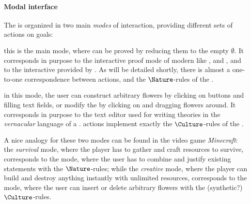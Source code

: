 \begin{scope}
\paragraph{Modal interface}

The  is organized in two main \emph{modes} of interaction,
providing different sets of  actions on
goals:
\begin{description}
   this is the main mode, where  can be proved by
  reducing them to the empty  $\emptyset$. It corresponds in purpose to
  the interactive proof mode of modern  like ,  and
  , and to the interactive  provided by .
  As will be detailed shortly, there is almost a one-to-one correspondence
  between  actions, and the $\Nature$-rules of the .
  
   in this mode, the user can construct arbitrary
  flowers by clicking on buttons and filling text fields, or modify the
   by clicking on and dragging flowers around. It corresponds in
  purpose to the text editor used for writing theories in the \emph{vernacular}
  language of a . 
  actions implement exactly the $\Culture$-rules of the .
\end{description}

\begin{remark}
  A nice analogy for these two modes can be found in the video game
  \emph{Minecraft}: the \emph{survival} mode, where the player has to gather and
  craft resources to survive, corresponds to the  mode, where the user has
  to combine and justify existing statements with the  $\Nature$-rules;
  while the \emph{creative} mode, where the player can build and destroy
  anything instantly with unlimited resources, corresponds to the  mode,
  where the user can insert or delete arbitrary flowers with the (synthetic?)
  $\Culture$-rules.
\end{remark}


\end{scope}
